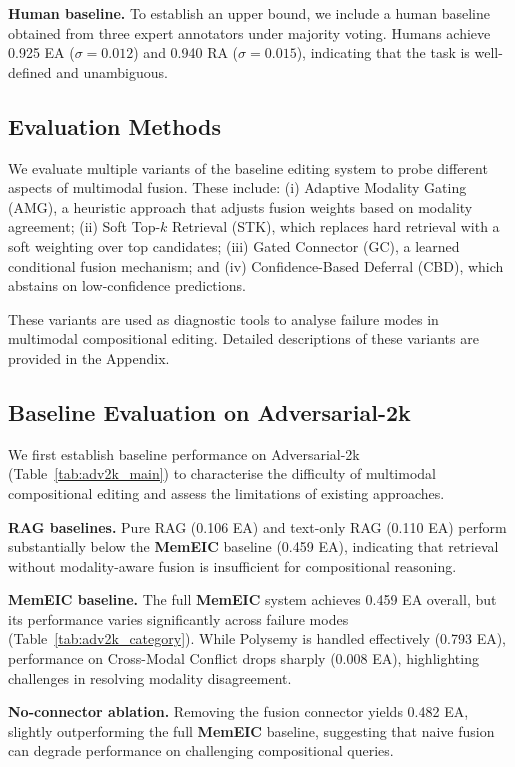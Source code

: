 \documentclass{article}
\newcommand{\memeic}{\textbf{MemEIC}}
\begin{document}
\textbf{Human baseline.} To establish an upper bound, we include a human baseline obtained from three expert annotators under majority voting. Humans achieve 0.925 EA ($\sigma = 0.012$) and 0.940 RA ($\sigma = 0.015$), indicating that the task is well-defined and unambiguous.




\subsection{Evaluation Methods}

We evaluate multiple variants of the baseline editing system to probe different aspects of multimodal fusion. These include: (i) Adaptive Modality Gating (AMG), a heuristic approach that adjusts fusion weights based on modality agreement; (ii) Soft Top-$k$ Retrieval (STK), which replaces hard retrieval with a soft weighting over top candidates; (iii) Gated Connector (GC), a learned conditional fusion mechanism; and (iv) Confidence-Based Deferral (CBD), which abstains on low-confidence predictions.

These variants are used as diagnostic tools to analyse failure modes in multimodal compositional editing. Detailed descriptions of these variants are provided in the Appendix.

\subsection{Baseline Evaluation on Adversarial-2k}
\label{sec:baseline_results}

We first establish baseline performance on Adversarial-2k (Table~\ref{tab:adv2k_main}) to characterise the difficulty of multimodal compositional editing and assess the limitations of existing approaches.

\textbf{RAG baselines.} Pure RAG (0.106 EA) and text-only RAG (0.110 EA) perform substantially below the \memeic{} baseline (0.459 EA), indicating that retrieval without modality-aware fusion is insufficient for compositional reasoning.

\textbf{MemEIC baseline.} The full \memeic{} system achieves 0.459 EA overall, but its performance varies significantly across failure modes (Table~\ref{tab:adv2k_category}). While Polysemy is handled effectively (0.793 EA), performance on Cross-Modal Conflict drops sharply (0.008 EA), highlighting challenges in resolving modality disagreement.

\textbf{No-connector ablation.} Removing the fusion connector yields 0.482 EA, slightly outperforming the full \memeic{} baseline, suggesting that naive fusion can degrade performance on challenging compositional queries.
\end{document}
